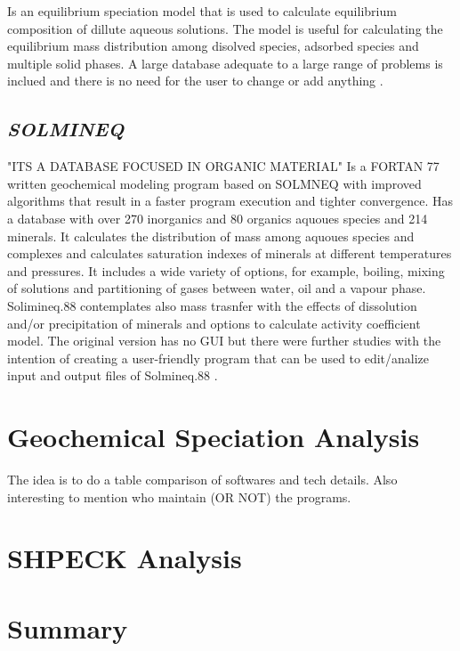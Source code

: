 \documentclass[ppgc,mestrado,english]{iiufrgs}
\begin{document}
Is an equilibrium speciation model that is used to calculate equilibrium composition of dillute aqueous solutions. The model is useful for calculating the equilibrium mass distribution among disolved species, adsorbed species and multiple solid phases. A large database adequate to a large range of problems is inclued and there is no need for the user to change or add anything \cite{Brown:87} \cite{Allison:91}.


\subsection{\emph{SOLMINEQ}} "ITS A DATABASE FOCUSED IN ORGANIC MATERIAL"
Is a FORTAN 77 written geochemical modeling program based on SOLMNEQ with improved algorithms that result in a faster program execution and tighter convergence. Has a database with over 270 inorganics and 80 organics aquoues species and 214 minerals. It calculates the distribution of mass among aquoues species and complexes and calculates saturation indexes of minerals at different temperatures and pressures. It includes a wide variety of options, for example, boiling, mixing of solutions and partitioning of gases between water, oil and a vapour phase. Solimineq.88 contemplates also mass trasnfer with the effects of dissolution and/or precipitation of minerals and options to calculate activity coefficient model. The original version has no GUI but there were further studies with the intention of creating a user-friendly program that can be used to edit/analize input and output files of Solmineq.88 \cite{Kharaka:73}.



\section{Geochemical Speciation Analysis}
The idea is to do a table comparison of softwares and tech details. Also interesting to mention who maintain (OR NOT) the programs.

\section{SHPECK Analysis}

\section{Summary}


\end{document}
